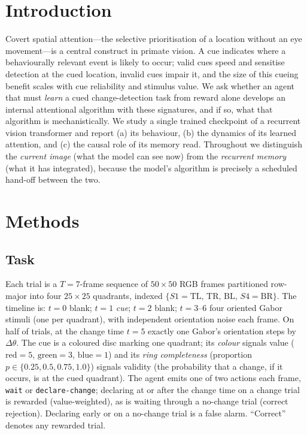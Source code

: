 \documentclass[11pt]{article}
\begin{document}
\section{Introduction}
Covert spatial attention---the selective prioritisation of a location without an eye movement---is a
central construct in primate vision. A cue indicates where a behaviourally relevant event is likely to
occur; valid cues speed and sensitise detection at the cued location, invalid cues impair it, and the
size of this cueing benefit scales with cue reliability and stimulus value. We ask whether an agent that
must \emph{learn} a cued change-detection task from reward alone develops an internal attentional
algorithm with these signatures, and if so, what that algorithm is mechanistically. We study a single
trained checkpoint of a recurrent vision transformer and report (a) its behaviour, (b) the dynamics of
its learned attention, and (c) the causal role of its memory read. Throughout we distinguish the
\emph{current image} (what the model can see now) from the \emph{recurrent memory} (what it has
integrated), because the model's algorithm is precisely a scheduled hand-off between the two.

\section{Methods}
\subsection{Task}
Each trial is a $T=7$-frame sequence of $50\times50$ RGB frames partitioned row-major into four
$25\times25$ quadrants, indexed $\{S1{=}\text{TL},\,\text{TR},\,\text{BL},\,S4{=}\text{BR}\}$. The
timeline is: $t{=}0$ blank; $t{=}1$ \emph{cue}; $t{=}2$ blank; $t{=}3$--$6$ four oriented Gabor
stimuli (one per quadrant), with independent orientation noise each frame. On half of trials, at the
change time $t{=}5$ exactly one Gabor's orientation steps by $\Delta\theta$. The cue is a coloured disc
marking one quadrant; its \emph{colour} signals value ($\text{red}{=}5$, $\text{green}{=}3$,
$\text{blue}{=}1$) and its \emph{ring completeness} (proportion $p\in\{0.25,0.5,0.75,1.0\}$) signals
validity (the probability that a change, if it occurs, is at the cued quadrant). The agent emits one of
two actions each frame, \texttt{wait} or \texttt{declare-change}; declaring at or after the change time
on a change trial is rewarded (value-weighted), as is waiting through a no-change trial (correct
rejection). Declaring early or on a no-change trial is a false alarm. ``Correct'' denotes any rewarded
trial.
\end{document}
